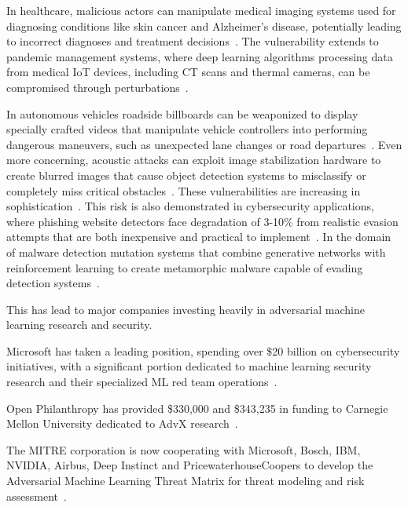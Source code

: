 \documentclass[a4paper, oneside]{discothesis}
\begin{document}
In healthcare, malicious actors can manipulate medical imaging systems used for diagnosing conditions like skin cancer and Alzheimer's disease, potentially leading to incorrect diagnoses and treatment decisions~\cite{jogani2022analysis, najafi2024dft}. The vulnerability extends to pandemic management systems, where deep learning algorithms processing data from medical IoT devices, including CT scans and thermal cameras, can be compromised through perturbations~\cite{9154468}.

In autonomous vehicles roadside billboards can be weaponized to display specially crafted videos that manipulate vehicle controllers into performing dangerous maneuvers, such as unexpected lane changes or road departures~\cite{Patel2019AdaptiveAV}. Even more concerning, acoustic attacks can exploit image stabilization hardware to create blurred images that cause object detection systems to misclassify or completely miss critical obstacles~\cite{Ji2021PoltergeistAA}. These vulnerabilities are increasing in sophistication~\cite{Axelrod2017CybersecurityCO}. This risk is also demonstrated in cybersecurity applications, where phishing website detectors face degradation of 3-10\% from realistic evasion attempts that are both inexpensive and practical to implement~\cite{Yuan2023MultiSpacePhishET}. In the domain of malware detection mutation systems that combine generative networks with reinforcement learning to create metamorphic malware capable of evading detection systems~\cite{to2023effectiveness}.

This has lead to major companies investing heavily in adversarial machine learning research and security.

Microsoft has taken a leading position, spending over \$20 billion on cybersecurity initiatives, with a significant portion dedicated to machine learning security research and their specialized ML red team operations~\cite{coursera_adversarial_2024}.

Open Philanthropy has provided \$330,000 and \$343,235 in funding to Carnegie Mellon University dedicated to AdvX research~\cite{openphil2024adversarial}.

The MITRE corporation is now cooperating with Microsoft, Bosch, IBM, NVIDIA, Airbus, Deep Instinct and PricewaterhouseCoopers to develop the Adversarial Machine Learning Threat Matrix for threat modeling and risk assessment~\cite{mitre2024ml}.
\end{document}
